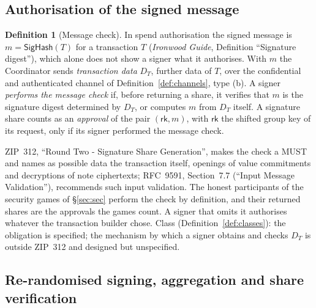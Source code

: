 \documentclass[11pt,a4paper]{article}
\theoremstyle{definition}
\newtheorem{definition}[theorem]{Definition}
\newcommand{\rk}{\mathsf{rk}}
\begin{document}
\subsection{Authorisation of the signed message}\label{sec:auth-message}

\begin{definition}[Message check]\label{def:msg-check}
In spend authorisation the signed message is \(m = \mathsf{SigHash}(T)\)
for a transaction \(T\) (\emph{Ironwood Guide}, Definition ``Signature
digest''), which alone does not show a signer what it authorises. With
\(m\) the Coordinator sends \emph{transaction data} \(D_T\), further data of
\(T\), over the confidential and authenticated channel of
Definition~\ref{def:channels}, type (b). A signer \emph{performs the
message check} if, before returning a share, it verifies that \(m\) is the
signature digest determined by \(D_T\), or computes \(m\) from \(D_T\)
itself. A signature share counts as an \emph{approval} of the pair
\((\rk, m)\), with \(\rk\) the shifted group key of its request, only if its
signer performed the message check.
\end{definition}

ZIP~312, ``Round Two - Signature Share Generation'', makes the check a MUST
and names as possible data the transaction itself, openings of value
commitments and decryptions of note ciphertexts; RFC~9591, Section~7.7
(``Input Message Validation''), recommends such input validation. The honest
participants of the security games of \S\ref{sec:sec} perform the check by
definition, and their returned shares are the approvals the games count. A
signer that omits it authorises whatever the transaction builder chose.
Class (Definition~\ref{def:classes}): the obligation is specified; the
mechanism by which a signer obtains and checks \(D_T\) is outside ZIP~312
and designed but unspecified.

\subsection{Re-randomised signing, aggregation and share verification}
\label{sec:rr-sign}
\end{document}
